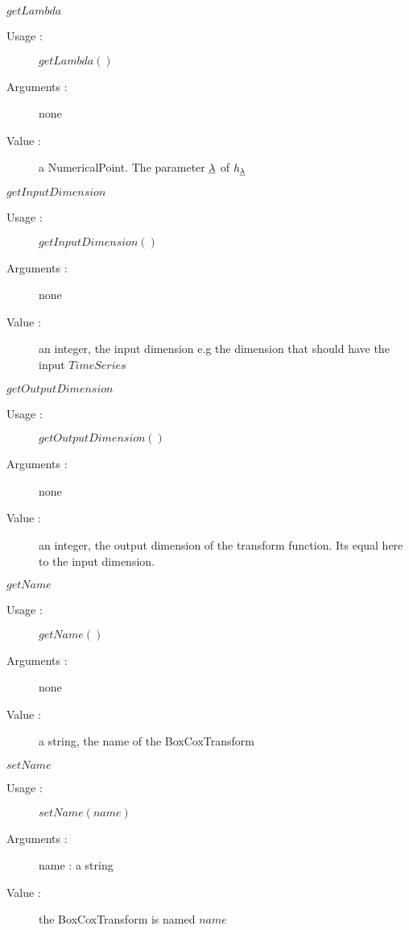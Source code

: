 \begin{description}
\begin{description}
   \item $getLambda$
    \begin{description}
    \item[Usage :] $getLambda()$
    \item[Arguments :] none
    \item[Value :]   a NumericalPoint. The parameter ${\underline{\lambda}}$  of $h_{{\underline{\lambda}}}$
    \end{description}
    \bigskip

   \item $getInputDimension$
    \begin{description}
    \item[Usage :] $getInputDimension()$
    \item[Arguments :] none
    \item[Value :]   an integer, the input dimension e.g the dimension that should have the input $TimeSeries$
    \end{description}
    \bigskip

   \item $getOutputDimension$
    \begin{description}
    \item[Usage :] $getOutputDimension()$
    \item[Arguments :] none
    \item[Value :]   an integer, the output dimension of the transform function. Its equal here to the input dimension.
    \end{description}
    \bigskip

  \item $getName$
    \begin{description}
    \item[Usage :] $getName()$
    \item[Arguments :] none
    \item[Value :] a string, the name of the BoxCoxTransform
    \end{description}
    \bigskip

  \item $setName$
    \begin{description}
    \item[Usage :] $setName(name)$
    \item[Arguments :] name : a string
    \item[Value :] the BoxCoxTransform is named $name$
    \end{description}
    \bigskip


  \end{description}

\end{description}

